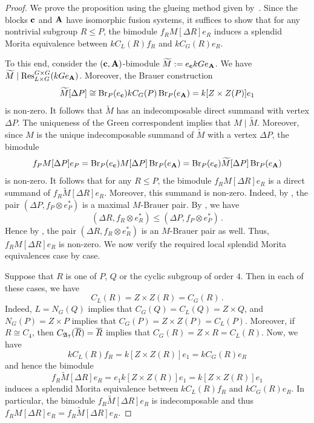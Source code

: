 \begin{proof}
We prove the proposition using the glueing method given by~\cite[Theorem~3.1]{Lin01}. Since the blocks ${\mathbf{c}}$ and ${\mathbf{A}}$ have isomorphic fusion systems, it suffices to show that for any nontrivial subgroup $R\le P$, the bimodule $f_RM[\Delta R]e_R$ induces a splendid Morita equivalence between $kC_L(R)f_R$ and $kC_G(R)e_R$.
\par
To this end, consider the $({\mathbf{c}},{\mathbf{A}})$-bimodule $\widetilde{M}:=e_{\mathbf{c}} kGe_{\mathbf{A}}$. We have $\widetilde{M} \mid \operatorname{Res}^{G\times G}_{L\times G}(kG e_{\mathbf{A}})$. Moreover, the Brauer construction
\[
\widetilde{M}[\Delta P]\cong \operatorname{Br}_P(e_{\mathbf{c}})kC_G(P)\operatorname{Br}_P(e_{\mathbf{A}})=k[Z\times Z(P)]e_1
\]
is non-zero. It follows that $\widetilde{M}$ has an indecomposable direct summand with vertex $\Delta P$. The uniqueness of the Green correspondent implies that $M \mid \widetilde{M}$. Moreover, since $M$ is the unique indecomposable summand of $\widetilde{M}$ with a vertex $\Delta P$, the bimodule 
\[
f_PM[\Delta P]e_P=\operatorname{Br}_P(e_{\mathbf{c}})M[\Delta P]\operatorname{Br}_P(e_{\mathbf{A}})=\operatorname{Br}_P(e_{\mathbf{c}})\widetilde{M}[\Delta P]\operatorname{Br}_P(e_{\mathbf{A}})
\]
is non-zero. It follows that for any $R\le P$, the bimodule $f_RM[\Delta R]e_R$ is a direct summand of $f_R\widetilde{M}[\Delta R]e_R$. Moreover, this summand is non-zero. Indeed, by \cite[Proposition~5.3(c)]{BoltjePerepelitsky}, the pair $(\Delta P, f_P\otimes e_P^*)$ is a maximal $M$-Brauer pair. By \cite[Remark~10.2(c)]{BoltjePerepelitsky}, we have 
\[
(\Delta R, f_R\otimes e_R^*)\le (\Delta P,f_P\otimes e_P^*)\,.
\]
Hence by \cite[Proposition~5.3(b)]{BoltjePerepelitsky}, the pair $(\Delta R, f_R\otimes e_R^*)$ is an $M$-Brauer pair as well. Thus, $f_RM[\Delta R]e_R$ is non-zero. We now verify the required local splendid Morita equivalences case by case.

\medskip
{} Suppose that $R$ is one of $P$, $Q$ or the cyclic subgroup of order $4$. Then in each of these cases, we have 
\[
C_L(R)=Z\times Z(R)=C_G(R)\,.
\]
Indeed, $L=N_G(Q)$ implies that $C_G(Q)=C_L(Q)=Z\times Q$, and $N_G(P)=Z\times P$ implies that $C_G(P)=Z\times Z(P)=C_L(P)$. Moreover, if $R\cong C_4$, then $C_{{\mathfrak{A}}_7}(\overline{R})=\overline{R}$ implies that $C_G(R)=Z\times R=C_L(R)$. Now, we have
\[
kC_L(R)f_R=k[Z\times Z(R)]e_1=kC_G(R)e_R
\]
and hence the bimodule
\[
f_R\widetilde{M}[\Delta R]e_R=e_1k[Z\times Z(R)]e_1=k[Z\times Z(R)]e_1
\]
induces a splendid Morita equivalence between $kC_L(R)f_R$ and $kC_G(R)e_R$. In particular, the bimodule $f_R\widetilde{M}[\Delta R]e_R$ is indecomposable and thus $f_RM[\Delta R]e_R=f_R\widetilde{M}[\Delta R]e_R$.


\end{proof}

